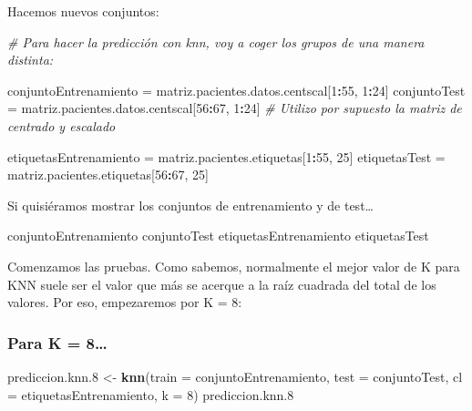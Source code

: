\documentclass[]{article}
\newenvironment{Shaded}{\begin{snugshade}}{\end{snugshade}}
\newcommand{\KeywordTok}[1]{\textcolor[rgb]{0.13,0.29,0.53}{\textbf{#1}}}
\newcommand{\DataTypeTok}[1]{\textcolor[rgb]{0.13,0.29,0.53}{#1}}
\newcommand{\DecValTok}[1]{\textcolor[rgb]{0.00,0.00,0.81}{#1}}
\newcommand{\StringTok}[1]{\textcolor[rgb]{0.31,0.60,0.02}{#1}}
\newcommand{\CommentTok}[1]{\textcolor[rgb]{0.56,0.35,0.01}{\textit{#1}}}
\newcommand{\OperatorTok}[1]{\textcolor[rgb]{0.81,0.36,0.00}{\textbf{#1}}}
\newcommand{\NormalTok}[1]{#1}
\begin{document}
Hacemos nuevos conjuntos:

\begin{Shaded}
\begin{Highlighting}[]
\CommentTok{# Para hacer la predicción con knn, voy a coger los grupos de una manera distinta:}

\NormalTok{conjuntoEntrenamiento =}\StringTok{ }\NormalTok{matriz.pacientes.datos.centscal[}\DecValTok{1}\OperatorTok{:}\DecValTok{55}\NormalTok{, }\DecValTok{1}\OperatorTok{:}\DecValTok{24}\NormalTok{]}
\NormalTok{conjuntoTest =}\StringTok{ }\NormalTok{matriz.pacientes.datos.centscal[}\DecValTok{56}\OperatorTok{:}\DecValTok{67}\NormalTok{, }\DecValTok{1}\OperatorTok{:}\DecValTok{24}\NormalTok{] }\CommentTok{# Utilizo por supuesto la matriz de centrado y escalado}

\NormalTok{etiquetasEntrenamiento =}\StringTok{ }\NormalTok{matriz.pacientes.etiquetas[}\DecValTok{1}\OperatorTok{:}\DecValTok{55}\NormalTok{, }\DecValTok{25}\NormalTok{]}
\NormalTok{etiquetasTest =}\StringTok{ }\NormalTok{matriz.pacientes.etiquetas[}\DecValTok{56}\OperatorTok{:}\DecValTok{67}\NormalTok{, }\DecValTok{25}\NormalTok{]}
\end{Highlighting}
\end{Shaded}

Si quisiéramos mostrar los conjuntos de entrenamiento y de test\ldots{}

\begin{Shaded}
\begin{Highlighting}[]
\NormalTok{conjuntoEntrenamiento}
\NormalTok{conjuntoTest}
\NormalTok{etiquetasEntrenamiento}
\NormalTok{etiquetasTest}
\end{Highlighting}
\end{Shaded}

Comenzamos las pruebas. Como sabemos, normalmente el mejor valor de K
para KNN suele ser el valor que más se acerque a la raíz cuadrada del
total de los valores. Por eso, empezaremos por K = 8:

\subsubsection{Para K = 8\ldots{}}\label{para-k-8}

\begin{Shaded}
\begin{Highlighting}[]
\NormalTok{prediccion.knn.}\DecValTok{8}\NormalTok{ <-}\StringTok{ }\KeywordTok{knn}\NormalTok{(}\DataTypeTok{train =}\NormalTok{ conjuntoEntrenamiento, }\DataTypeTok{test =}\NormalTok{ conjuntoTest, }\DataTypeTok{cl =}\NormalTok{ etiquetasEntrenamiento, }\DataTypeTok{k =} \DecValTok{8}\NormalTok{)}
\NormalTok{prediccion.knn.}\DecValTok{8}
\end{Highlighting}
\end{Shaded}
\end{document}
